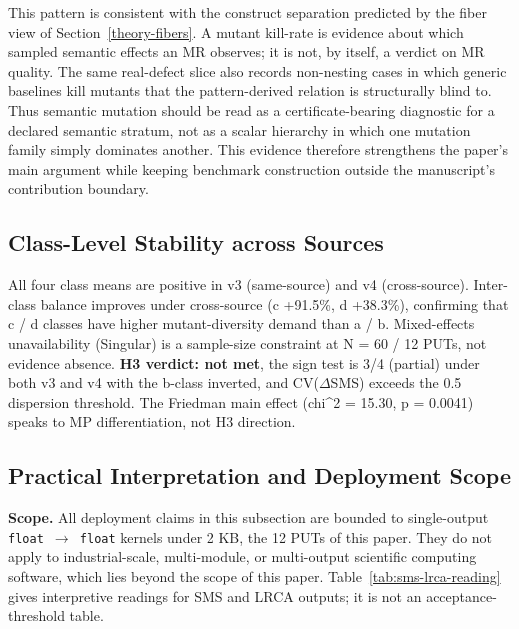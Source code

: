 \documentclass[12pt]{article}
\begin{document}
This pattern is consistent with the construct separation predicted by the
fiber view of Section~\ref{theory-fibers}. A mutant kill-rate is evidence about which sampled
semantic effects an MR observes; it is not, by itself, a verdict on MR
quality. The same real-defect slice also records non-nesting cases in
which generic baselines kill mutants that the pattern-derived relation is
structurally blind to.
Thus semantic mutation should be read as a certificate-bearing diagnostic
for a declared semantic stratum, not as a scalar hierarchy in which one
mutation family simply dominates another. This evidence therefore
strengthens the paper's main argument while keeping benchmark construction
outside the manuscript's contribution boundary.

\subsection{Class-Level Stability across Sources}\label{h4-partial-across-same-source-and-cross-source}

All four class means are positive in v3 (same-source) and v4
(cross-source). Inter-class balance improves under cross-source (c
+91.5\%, d +38.3\%), confirming that c / d classes have higher
mutant-diversity demand than a / b. Mixed-effects unavailability
(Singular) is a sample-size constraint at N = 60 / 12 PUTs, not evidence
absence. \textbf{H3 verdict: not met}, the sign test is 3/4 (partial)
under both v3 and v4 with the b-class inverted, and CV($\Delta$SMS)
exceeds the 0.5 dispersion threshold. The Friedman main effect (chi\^{}2 =
15.30, p = 0.0041) speaks to MP differentiation, not H3 direction.

\subsection{Practical Interpretation and Deployment Scope}\label{stakeholder-analysis-single-output-kernels-scope}

\textbf{Scope.} All deployment claims in this subsection are bounded to
single-output \texttt{float\ $\to$\ float} kernels under 2 KB, the 12 PUTs
of this paper. They do not apply to industrial-scale, multi-module, or
multi-output scientific computing software, which lies beyond the scope of this paper.
Table~\ref{tab:sms-lrca-reading} gives interpretive readings for SMS and
LRCA outputs; it is not an acceptance-threshold table.
\end{document}
